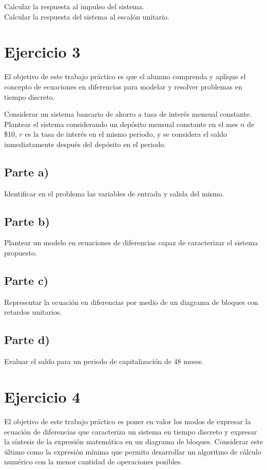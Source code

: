 \documentclass[a4paper,12pt]{report}
\begin{document}
Calcular la respuesta al impulso del sistema. \\
Calcular la respuesta del sistema al escalón unitario.

\chapter{Ejercicio 3}
El objetivo de este trabajo práctico es que el alumno comprenda y aplique el concepto de ecuaciones en diferencias para modelar y resolver problemas en tiempo discreto.

Considerar un sistema bancario de ahorro a tasa de interés mensual constante. Plantear el sistema considerando un depósito mensual constante en el mes $n$ de \$10, $r$ es la tasa de interés en el mismo periodo, y se considera el saldo inmediatamente después del depósito en el periodo.

\section{Parte a)}
Identificar en el problema las variables de entrada y salida del mismo.

\section{Parte b)}
Plantear un modelo en ecuaciones de diferencias capaz de caracterizar el sistema propuesto.

\section{Parte c)}
Representar la ecuación en diferencias por medio de un diagrama de bloques con retardos unitarios.

\section{Parte d)}
Evaluar el saldo para un periodo de capitalización de 48 meses.

\chapter{Ejercicio 4}
El objetivo de este trabajo práctico es poner en valor los modos de expresar la ecuación de diferencias que caracteriza un sistema en tiempo discreto y expresar la síntesis de la expresión matemática en un diagrama de bloques. Considerar este último como la expresión mínima que permita desarrollar un algoritmo de cálculo numérico con la menor cantidad de operaciones posibles.
\end{document}
